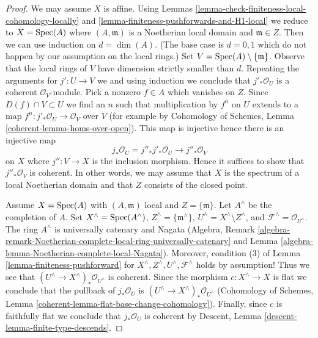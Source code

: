 \begin{proof}
We may assume $X$ is affine.
Using Lemmas \ref{lemma-check-finiteness-local-cohomology-locally} and
\ref{lemma-finiteness-pushforwards-and-H1-local} we reduce to
$X = \mathop{\mathrm{Spec}}(A)$ where $(A, \mathfrak m)$ is a Noetherian local domain
and $\mathfrak m \in Z$.
Then we can use induction on $d = \dim(A)$.
(The base case is $d = 0, 1$ which do not happen by
our assumption on the local rings.)
Set $V = \mathop{\mathrm{Spec}}(A) \setminus \{\mathfrak m\}$.
Observe that the local rings of $V$ have dimension strictly smaller than $d$.
Repeating the arguments for $j' : U \to V$ we
and using induction we conclude that $j'_*\mathcal{O}_U$ is
a coherent $\mathcal{O}_V$-module.
Pick a nonzero $f \in A$ which vanishes on $Z$.
Since $D(f) \cap V \subset U$ we find an $n$ such that
multiplication by $f^n$ on $U$ extends to a map
$f^n : j'_*\mathcal{O}_U \to \mathcal{O}_V$ over $V$
(for example by Cohomology of Schemes, Lemma
\ref{coherent-lemma-homs-over-open}). This map is injective
hence there is an injective map
$$
j_*\mathcal{O}_U = j''_* j'_* \mathcal{O}_U \to j''_*\mathcal{O}_V
$$
on $X$ where $j'' : V \to X$ is the inclusion morphism.
Hence it suffices to show that $j''_*\mathcal{O}_V$ is coherent.
In other words, we may assume that $X$ is the spectrum
of a local Noetherian domain and that $Z$
consists of the closed point.

\medskip\noindent
Assume $X = \mathop{\mathrm{Spec}}(A)$ with $(A, \mathfrak m)$ local and $Z = \{\mathfrak m\}$.
Let $A^\wedge$ be the completion of $A$.
Set $X^\wedge = \mathop{\mathrm{Spec}}(A^\wedge)$, $Z^\wedge = \{\mathfrak m^\wedge\}$,
$U^\wedge = X^\wedge \setminus Z^\wedge$, and
$\mathcal{F}^\wedge = \mathcal{O}_{U^\wedge}$.
The ring $A^\wedge$ is universally catenary and Nagata (Algebra, Remark
\ref{algebra-remark-Noetherian-complete-local-ring-universally-catenary} and
Lemma \ref{algebra-lemma-Noetherian-complete-local-Nagata}).
Moreover, condition (3) of Lemma \ref{lemma-finiteness-pushforward}
for $X^\wedge, Z^\wedge, U^\wedge, \mathcal{F}^\wedge$
holds by assumption! Thus we see that
$(U^\wedge \to X^\wedge)_*\mathcal{O}_{U^\wedge}$
is coherent. Since the morphism $c : X^\wedge \to X$
is flat we conclude that the pullback of $j_*\mathcal{O}_U$ is
$(U^\wedge \to X^\wedge)_*\mathcal{O}_{U^\wedge}$
(Cohomology of Schemes, Lemma
\ref{coherent-lemma-flat-base-change-cohomology}).
Finally, since $c$ is faithfully flat we conclude that
$j_*\mathcal{O}_U$ is coherent by
Descent, Lemma \ref{descent-lemma-finite-type-descends}.
\end{proof}

